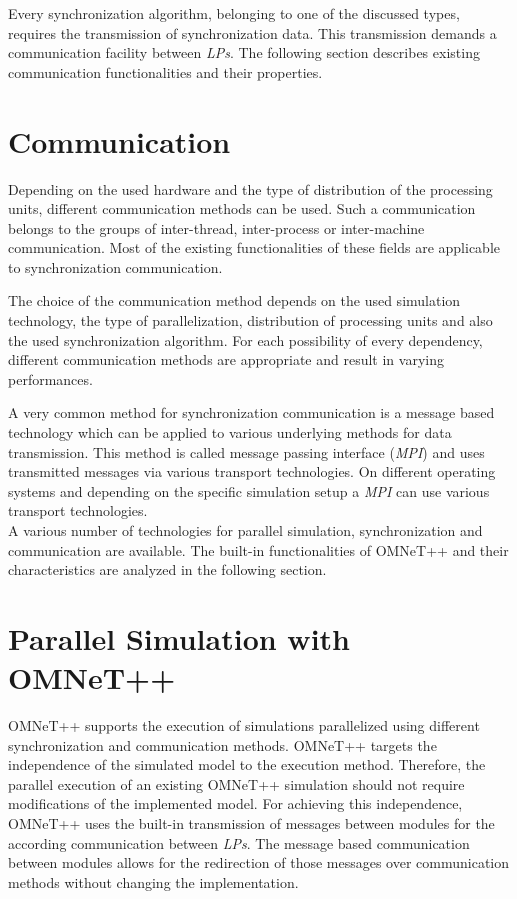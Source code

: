 Every synchronization algorithm, belonging to one of the discussed types, requires the transmission of synchronization data.
This transmission demands a communication facility between \emph{LPs}.
The following section describes existing communication functionalities and their properties.

\section{Communication}
\label{sec:parallel_communication}
Depending on the used hardware and the type of distribution of the processing units, different communication methods can be used.
Such a communication belongs to the groups of inter-thread, inter-process or inter-machine communication.
Most of the existing functionalities of these fields are applicable to synchronization communication.

The choice of the communication method depends on the used simulation technology, the type of parallelization, distribution of processing units and also the used synchronization algorithm.
For each possibility of every dependency, different communication methods are appropriate and result in varying performances.

A very common method for synchronization communication is a message based technology which can be applied to various underlying methods for data transmission.
This method is called message passing interface (\emph{MPI}) and uses transmitted messages via various transport technologies.
On different operating systems and depending on the specific simulation setup a \emph{MPI} can use various transport technologies.\cite{the_mpi_forum_mpi:_2015}
\\

A various number of technologies for  parallel simulation, synchronization and communication are available.
The built-in functionalities of OMNeT++ and their characteristics are analyzed in the following section.

\section{Parallel Simulation with OMNeT++}
\label{sec:parallel_omnet}
OMNeT++ supports the execution of simulations parallelized using different synchronization and communication methods.
OMNeT++ targets the independence of the simulated model to the execution method.
Therefore, the parallel execution of an existing OMNeT++ simulation should not require modifications of the implemented model.
For achieving this independence, OMNeT++ uses the built-in transmission of messages between modules for the according communication between \emph{LPs}.
The message based communication between modules allows for the redirection of those messages over communication methods without changing the implementation.

